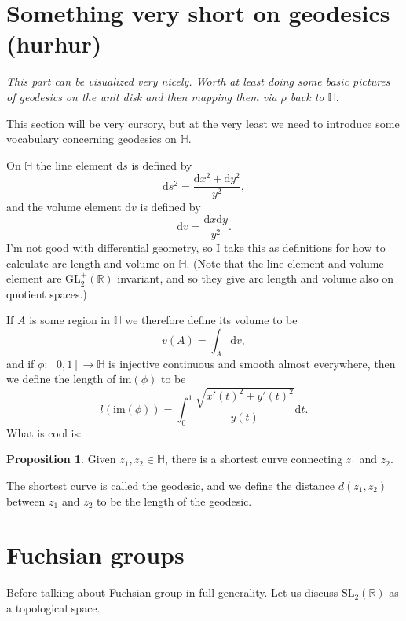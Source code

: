 \documentclass{article}
\theoremstyle{definition}
\newtheorem{prop}{Proposition}
\begin{document}
\section{Something very short on geodesics (hurhur)}
{\it This part can be visualized very nicely. Worth at least doing some basic pictures of geodesics on the unit disk and then mapping them via $\rho$ back to $\mathbb{H}$.}

This section will be very cursory, but at the very least we need to introduce some vocabulary concerning geodesics on $\mathbb{H}$.

On $\mathbb{H}$ the line element $\mathrm{d}s$ is defined by
\[\mathrm{d}s^2=\frac{\mathrm{d}x^2+\mathrm{d}y^2}{y^2},\]
and the volume element $\mathrm{d}v$ is defined by
\[\mathrm{d}v=\frac{\mathrm{d}x\mathrm{d}y}{y^2}.\]
I'm not good with differential geometry, so I take this as definitions for how to calculate arc-length and volume on $\mathbb{H}$. (Note that the line element and volume element are $\mathrm{GL}_2^+(\mathbb{R})$ invariant, and so they give arc length and volume also on quotient spaces.)

If $A$ is some region in $\mathbb{H}$ we therefore define its volume to be
\[v(A)=\int_{A}\mathrm{d}v,\]
and if $\phi:[0,1]\to\mathbb{H}$ is injective continuous and smooth almost everywhere, then we define the length of $\mathrm{im}(\phi)$ to be
\[l(\mathrm{im}(\phi))=\int_0^1\frac{\sqrt{x'(t)^2+y'(t)^2}}{y(t)}\mathrm{d}t.\]
What is cool is:
\begin{prop}
	Given $z_1,z_2\in\mathbb{H}$, there is a shortest curve connecting $z_1$ and $z_2$.
\end{prop}
The shortest curve is called the geodesic, and we define the distance $d(z_1,z_2)$ between $z_1$ and $z_2$ to be the length of the geodesic.
\section{Fuchsian groups}
Before talking about Fuchsian group in full generality. Let us discuss $\mathrm{SL}_2(\mathbb{R})$ as a topological space.
\end{document}
